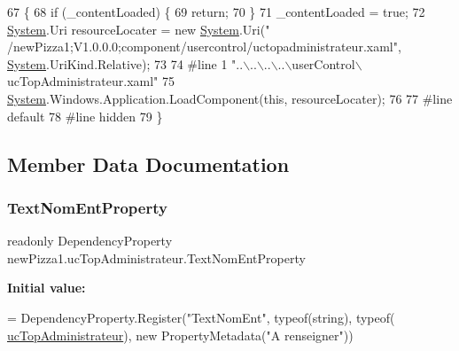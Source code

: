 \begin{DoxyCode}
67                                           \{
68             \textcolor{keywordflow}{if} (\_contentLoaded) \{
69                 \textcolor{keywordflow}{return};
70             \}
71             \_contentLoaded = \textcolor{keyword}{true};
72             \hyperlink{namespaceSystem}{System}.Uri resourceLocater = \textcolor{keyword}{new} \hyperlink{namespaceSystem}{System}.Uri(\textcolor{stringliteral}{"
      /newPizza1;V1.0.0.0;component/usercontrol/uctopadministrateur.xaml"}, \hyperlink{namespaceSystem}{System}.UriKind.Relative);
73             
74 \textcolor{preprocessor}{            #line 1 "..\(\backslash\)..\(\backslash\)..\(\backslash\)..\(\backslash\)userControl\(\backslash\)ucTopAdministrateur.xaml"
}
75             \hyperlink{namespaceSystem}{System}.Windows.Application.LoadComponent(\textcolor{keyword}{this}, resourceLocater);
76             
77 \textcolor{preprocessor}{            #line default
}
78 \textcolor{preprocessor}{            #line hidden
}
79         \}
\end{DoxyCode}


\subsection{Member Data Documentation}
\mbox{\label{classnewPizza1_1_1ucTopAdministrateur_a99d1f6f7dc1cba0a32d21ae318743bfd}} 
\subsubsection{\texorpdfstring{Text\+Nom\+Ent\+Property}{TextNomEntProperty}}
{\footnotesize\ttfamily readonly Dependency\+Property new\+Pizza1.\+uc\+Top\+Administrateur.\+Text\+Nom\+Ent\+Property\hspace{0.3cm}{\ttfamily [static]}}

{\bfseries Initial value\+:}
\begin{DoxyCode}
=
            DependencyProperty.Register(\textcolor{stringliteral}{"TextNomEnt"}, typeof(\textcolor{keywordtype}{string}), typeof(
      \hyperlink{classnewPizza1_1_1ucTopAdministrateur_a97ad9e9f26e5df784d8aa4e92619d8af}{ucTopAdministrateur}), \textcolor{keyword}{new} PropertyMetadata(\textcolor{stringliteral}{"A renseigner"}))
\end{DoxyCode}


